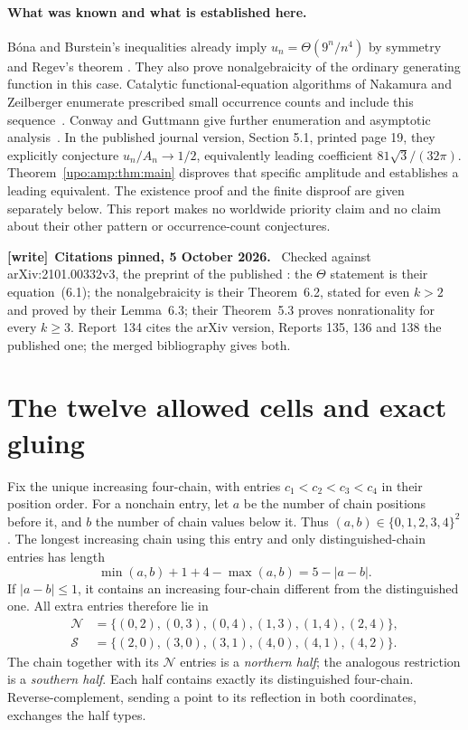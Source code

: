 \documentclass[11pt,letterpaper]{article}
\theoremstyle{remark}\newtheorem{remark}[theorem]{Remark}
\numberwithin{equation}{section}
\newenvironment{writenote}[1][]{\par\smallskip\begingroup\small
 \noindent\textbf{[write]}\if\relax\detokenize{#1}\relax\else~\textbf{#1.}\fi\ }%
 {\par\endgroup\smallskip}
\begin{document}
\paragraph{What was known and what is established here.}
B\'ona and Burstein's inequalities already imply
$u_n=\Theta(9^n/n^4)$ by symmetry and Regev's theorem
\cite[Section 6, equation (6.1)]{BB}. They also prove nonalgebraicity of the
ordinary generating function in this case. Catalytic functional-equation
algorithms of Nakamura and Zeilberger enumerate prescribed small occurrence
counts and include this sequence~\cite{NZ}. Conway and Guttmann give further
enumeration and asymptotic analysis~\cite{CG}. In the published journal
version, Section 5.1, printed page 19, they explicitly conjecture
$u_n/A_n\to1/2$, equivalently leading coefficient $81\sqrt3/(32\pi)$.
Theorem~\ref{upo:amp:thm:main} disproves that specific amplitude and establishes a
leading equivalent. The existence proof and the finite disproof are given
separately below. This report makes no worldwide priority claim and no
claim about their other pattern or occurrence-count conjectures.
\begin{writenote}[Citations pinned, 5 October 2026]
Checked against arXiv:2101.00332v3, the preprint of the published \cite{BB}: the $\Theta$ statement is their equation~(6.1); the nonalgebraicity is their Theorem~6.2, stated for even $k>2$ and proved by their Lemma~6.3; their Theorem~5.3 proves nonrationality for every $k\ge3$. Report~134 cites the arXiv version, Reports 135, 136 and 138 the published one; the merged bibliography gives both.
\end{writenote}

\section{The twelve allowed cells and exact gluing}\label{upo:amp:sec:gluing}
Fix the unique increasing four-chain, with entries $c_1<c_2<c_3<c_4$ in
their position order. For a nonchain entry, let $a$ be the number of chain
positions before it, and $b$ the number of chain values below it. Thus
$(a,b)\in\{0,1,2,3,4\}^2$. The longest increasing chain using this entry and
only distinguished-chain entries has length
\[
\min(a,b)+1+4-\max(a,b)=5-|a-b|.
\]
If $|a-b|\le1$, it contains an increasing four-chain different from the
distinguished one. All extra entries therefore lie in
\begin{align*}
\mathcal N&=\{(0,2),(0,3),(0,4),(1,3),(1,4),(2,4)\},\\
\mathcal S&=\{(2,0),(3,0),(3,1),(4,0),(4,1),(4,2)\}.
\end{align*}
The chain together with its $\mathcal N$ entries is a \emph{northern half};
the analogous restriction is a \emph{southern half}. Each half contains
exactly its distinguished four-chain. Reverse-complement, sending a point
to its reflection in both coordinates, exchanges the half types.
\end{document}
